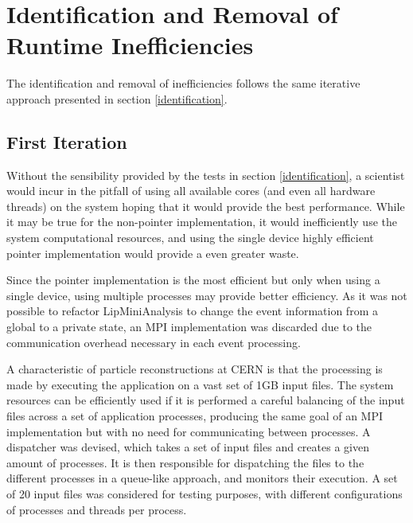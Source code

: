 \section{Identification and Removal of Runtime Inefficiencies}
\label{removal}

The identification and removal of inefficiencies follows the same iterative approach presented in section \ref{identification}.

\subsection{First Iteration}

Without the sensibility provided by the tests in section \ref{identification}, a scientist would incur in the pitfall of using all available cores (and even all hardware threads) on the system hoping that it would provide the best performance. While it may be true for the non-pointer implementation, it would inefficiently use the system computational resources, and using the single device highly efficient pointer implementation would provide a even greater waste.

Since the pointer implementation is the most efficient but only when using a single device, using multiple processes may provide better efficiency. As it was not possible to refactor LipMiniAnalysis to change the event information from a global to a private state, an MPI implementation was discarded due to the communication overhead necessary in each event processing.

A characteristic of particle reconstructions at CERN is that the processing is made by executing the application on a vast set of 1GB input files. The system resources can be efficiently used if it is performed a careful balancing of the input files across a set of application processes, producing the same goal of an MPI implementation but with no need for communicating between processes. A dispatcher was devised, which takes a set of input files and creates a given amount of \tth processes. It is then responsible for dispatching the files to the different processes in a queue-like approach, and monitors their execution. A set of 20 input files was considered for testing purposes, with different configurations of processes and threads per process.

